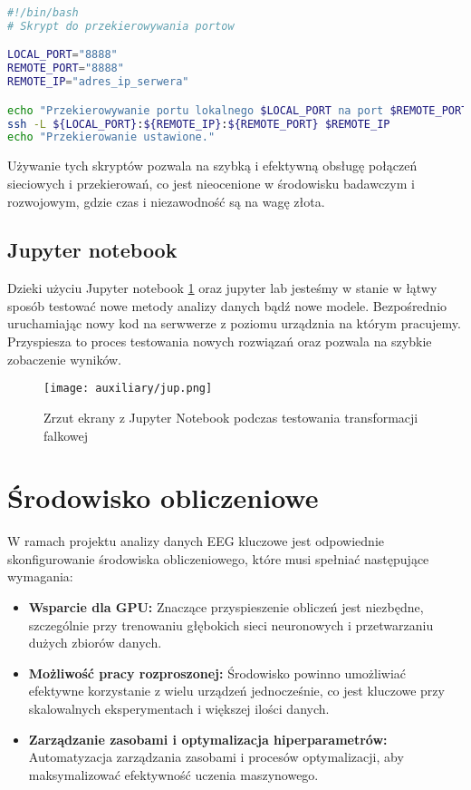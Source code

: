 \documentclass[12pt,twoside]{article}
\begin{document}
\begin{lstlisting}[language=bash, caption=Skrypt do przekierowywania portów]
#!/bin/bash
# Skrypt do przekierowywania portow

LOCAL_PORT="8888"
REMOTE_PORT="8888"
REMOTE_IP="adres_ip_serwera"

echo "Przekierowywanie portu lokalnego $LOCAL_PORT na port $REMOTE_PORT na serwerze $REMOTE_IP..."
ssh -L ${LOCAL_PORT}:${REMOTE_IP}:${REMOTE_PORT} $REMOTE_IP
echo "Przekierowanie ustawione."
\end{lstlisting}

Używanie tych skryptów pozwala na szybką i efektywną obsługę połączeń sieciowych i przekierowań, co jest nieocenione w środowisku badawczym i rozwojowym, gdzie czas i niezawodność są na wagę złota.

\subsection{Jupyter notebook}
Dzieki użyciu Jupyter notebook \ref{fig:jupyter_wavelet} oraz jupyter lab jesteśmy w stanie w łątwy sposób testować nowe metody analizy danych bądź nowe modele. Bezpośrednio uruchamiając nowy kod na serwwerze z poziomu urządznia na którym pracujemy. Przyspiesza to proces testowania nowych rozwiązań oraz pozwala na szybkie zobaczenie wyników.

\begin{figure}[ht]
    \centering
    \texttt{[image: auxiliary/jup.png]}
    \caption{Zrzut ekrany z Jupyter Notebook podczas testowania transformacji falkowej}
    \label{fig:jupyter_wavelet}
\end{figure}






\section{Środowisko obliczeniowe}
W ramach projektu analizy danych EEG kluczowe jest odpowiednie skonfigurowanie środowiska obliczeniowego, które musi spełniać następujące wymagania:
\begin{itemize}
	\item \textbf{Wsparcie dla GPU:} Znaczące przyspieszenie obliczeń jest niezbędne, szczególnie przy trenowaniu głębokich sieci neuronowych i przetwarzaniu dużych zbiorów danych.
	\item \textbf{Możliwość pracy rozproszonej:} Środowisko powinno umożliwiać efektywne korzystanie z wielu urządzeń jednocześnie, co jest kluczowe przy skalowalnych eksperymentach i większej ilości danych.
	\item \textbf{Zarządzanie zasobami i optymalizacja hiperparametrów:} Automatyzacja zarządzania zasobami i procesów optymalizacji, aby maksymalizować efektywność uczenia maszynowego.
\end{itemize}
\end{document}
